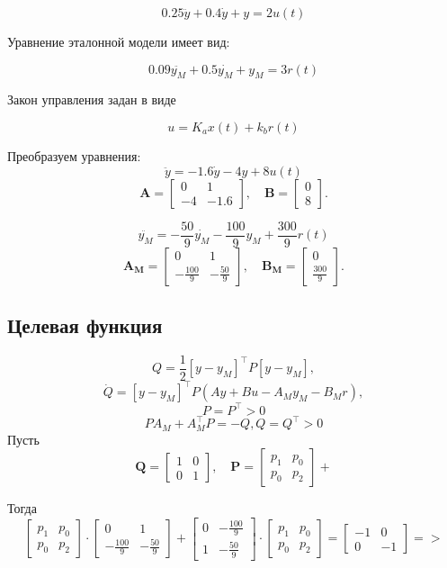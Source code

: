 \documentclass[a4paper,12pt]{extarticle} %
\begin{document}
\[
0.25\ddot{y} + 0.4\dot{y} + y = 2u(t)
\]

Уравнение эталонной модели имеет вид:

\[
0.09\ddot{y_M} + 0.5\dot{y_M} + y_M = 3r(t)
\]

Закон управления задан в виде 

\[
u = {K_a}x(t) + k_b r(t)
\]

Преобразуем уравнения:
\[
\ddot{y} = -1.6\dot{y} -4y + 8u(t)
\]
\[
\mathbf{A} = \begin{bmatrix} 0 & 1 \\ -4 & -1.6 \end{bmatrix}, \quad
\mathbf{B} = \begin{bmatrix} 0 \\ 8 \end{bmatrix}.
\]


\[
\ddot{y_M} = - \frac{50}{9}\dot{y_M} - \frac{100}{9}y_M + \frac{300}{9}r(t)
\]
\[
\mathbf{A_M} = \begin{bmatrix} 0 & 1 \\ - \frac{100}{9} & - \frac{50}{9} \end{bmatrix}, \quad
\mathbf{B_M} = \begin{bmatrix} 0 \\ \frac{300}{9} \end{bmatrix}.
\]



\subsection*{Целевая функция}
\[
Q = \frac{1}{2} [y - y_M]^\top P [y - y_M],
\]
\[
\dot{Q} = [y - y_M]^\top P (Ay+Bu-A_My_M-B_Mr),
\]
\[
P = P^\top > 0
\]
\[
PA_M + A_M^\top P = -Q, Q = Q^\top > 0
\]
Пусть 
\[
\mathbf{Q} = \begin{bmatrix} 1 & 0 \\ 0 & 1 \end{bmatrix}, \quad
\mathbf{P} = \begin{bmatrix} p_1 & p_0 \\ p_0 & p_2 \end{bmatrix} + 
\]

Тогда
\[
\begin{bmatrix} p_1 & p_0 \\ p_0 & p_2 \end{bmatrix} \cdot{}
\begin{bmatrix} 0 & 1 \\ - \frac{100}{9} & - \frac{50}{9} \end{bmatrix} +  
\begin{bmatrix} 0 & - \frac{100}{9} \\  1 & - \frac{50}{9} \end{bmatrix}\cdot{}
\begin{bmatrix} p_1 & p_0 \\ p_0 & p_2 \end{bmatrix} = 
\begin{bmatrix} -1 & 0 \\ 0 & -1 \end{bmatrix} =>
\]
\end{document}
